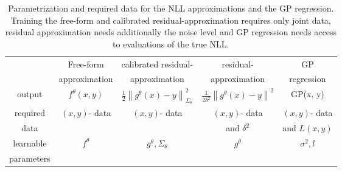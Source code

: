 \documentclass{amsart}
\theoremstyle{definition}
\newcommand{\norm}[1]{\left\|#1\right\|}
\begin{document}

\begin{table}[h]
    \centering
        \caption{Parametrization and required data for the NLL approximations and the GP regression. Training the free-form and calibrated residual-approximation requires only joint data, residual approximation needs additionally the noise level and GP regression needs access to evaluations of the true NLL.}
    \label{tab: NLL appproxs}
    \begin{tabular}{c | c c c c}
         & Free-form & calibrated residual-  & residual- & GP  \\
         & approximation& approximation  & approximation& regression \\
         \hline
        output &  $f^\theta(x, y)$ & $\frac{1}{2} \norm{g^\theta(x) - y}^2_{\Sigma_\theta}$ & $\frac{1}{2 \delta^2} 
        \norm{g^\theta(x) - y}^2$ & GP(x, y) \\
        \hline 
        required & $(x, y)$- data & $(x, y)$- data  & $(x, y)$- data &  $(x, y)$- data \\
        data & & & and $\delta^2$ & and $L(x, y)$ \\
        \hline 
        learnable & $f^\theta$ & $g^\theta, \Sigma_\theta$ & $g^\theta$ &  $\sigma^2, l$ \\
        parameters &  &  & & 
    \end{tabular}
\end{table}
\end{document}
